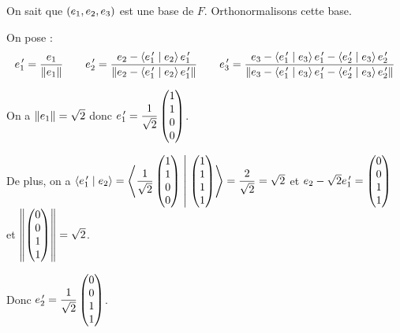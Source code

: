 \begin{corr}[1]
On sait que \(\left(e_1,e_2,e_3\right)\) est une base de \(F\). Orthonormalisons cette base.

On pose : \[e_1^{\,\prime}=\dfrac{e_1}{\left\|e_1\right\|}\qquad e_2^{\,\prime}=\dfrac{e_2-\left\langle e_1^{\,\prime}\;\middle|\; e_2\right\rangle e_1^{\,\prime}}{\left\|e_2-\left\langle e_1^{\,\prime}\;\middle|\; e_2\right\rangle e_1^{\,\prime}\right\|}\qquad e_3^{\,\prime}=\dfrac{e_3-\left\langle e_1^{\,\prime}\;\middle|\; e_3\right\rangle e_1^{\,\prime}-\left\langle e_2^{\,\prime}\;\middle|\; e_3\right\rangle e_2^{\,\prime}}{\left\|e_3-\left\langle e_1^{\,\prime}\;\middle|\; e_3\right\rangle e_1^{\,\prime}-\left\langle e_2^{\,\prime}\;\middle|\; e_3\right\rangle e_2^{\,\prime}\right\|}\]

On a \(\left\|e_1\right\|=\sqrt{2}\) donc \(e_1^{\,\prime}=\dfrac{1}{\sqrt{2}}\begin{pmatrix}
1 \\ 1 \\ 0 \\ 0
\end{pmatrix}\).

De plus, on a \(\left\langle e_1^{\,\prime}\;\middle|\; e_2\right\rangle=\left\langle\dfrac{1}{\sqrt{2}}\begin{pmatrix}
1 \\ 1 \\ 0 \\ 0
\end{pmatrix}\;\middle|\;\begin{pmatrix}
1 \\ 1 \\ 1 \\ 1
\end{pmatrix}\right\rangle=\dfrac{2}{\sqrt{2}}=\sqrt{2}\) et \(e_2-\sqrt{2}e_1^{\,\prime}=\begin{pmatrix}
0 \\ 0 \\ 1 \\ 1
\end{pmatrix}\) et \(\left\|\begin{pmatrix}
0 \\ 0 \\ 1 \\ 1
\end{pmatrix}\right\|=\sqrt{2}\).

Donc \(e_2^{\,\prime}=\dfrac{1}{\sqrt{2}}\begin{pmatrix}
0 \\ 0 \\ 1 \\ 1
\end{pmatrix}\).


\end{corr}
